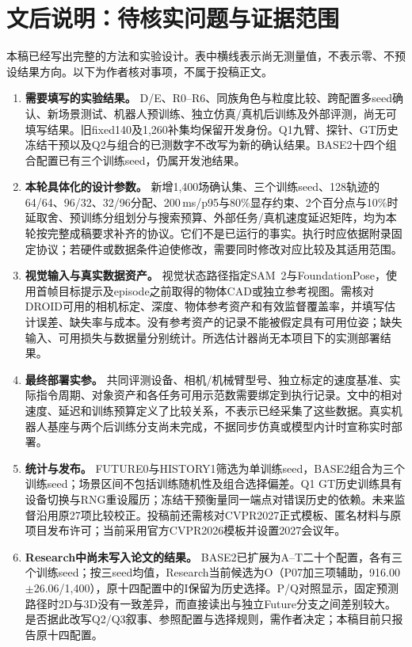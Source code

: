\section*{文后说明：待核实问题与证据范围}

本稿已经写出完整的方法和实验设计。表中横线表示尚无测量值，不表示零、不预设结果方向。以下为作者核对事项，不属于投稿正文。

\begin{enumerate}
\item \textbf{需要填写的实验结果。}
D/E、R0--R6、同族角色与粒度比较、跨配置多seed确认、新场景测试、机器人预训练、独立仿真/真机后训练及外部评测，尚无可填写结果。旧fixed140及1,260补集均保留开发身份。Q1九臂、探针、GT历史冻结干预以及Q2与组合的已测数字不改写为新的确认结果。BASE2十四个组合配置已有三个训练seed，仍属开发池结果。

\item \textbf{本轮具体化的设计参数。}
新增1,400场确认集、三个训练seed、128轨迹的64/64、96/32、32/96分配、200\,ms/p95与80\%显存约束、2个百分点与10\%时延取舍、预训练分组划分与搜索预算、外部任务/真机速度延迟矩阵，均为本轮按完整成稿要求补齐的协议。它们不是已运行的事实。执行时应依据附录固定协议；若硬件或数据条件迫使修改，需要同时修改对应比较及其适用范围。

\item \textbf{视觉输入与真实数据资产。}
视觉状态路径指定SAM~2与FoundationPose，使用首帧目标提示及episode之前取得的物体CAD或独立参考视图。需核对DROID可用的相机标定、深度、物体参考资产和有效监督覆盖率，并填写估计误差、缺失率与成本。没有参考资产的记录不能被假定具有可用位姿；缺失输入、可用损失与数据量分别统计。所选估计器尚无本项目下的实测部署结果。

\item \textbf{最终部署实参。}
共同评测设备、相机/机械臂型号、独立标定的速度基准、实际指令周期、对象资产和各任务可用示范数需要绑定到执行记录。文中的相对速度、延迟和训练预算定义了比较关系，不表示已经采集了这些数据。真实机器人基座与两个后训练分支尚未完成，不据同步仿真或模型内计时宣称实时部署。

\item \textbf{统计与发布。}
FUTURE0与HISTORY1筛选为单训练seed，BASE2组合为三个训练seed；场景区间不包括训练随机性及组合选择偏差。Q1 GT历史训练具有设备切换与RNG重设履历；冻结干预衡量同一端点对错误历史的依赖。未来监督沿用原27项比较校正。投稿前还需核对CVPR2027正式模板、匿名材料与原项目发布许可；当前采用官方CVPR2026模板并设置2027会议年。

\item \textbf{Research中尚未写入论文的结果。}
BASE2已扩展为A--T二十个配置，各有三个训练seed；按三seed均值，Research当前候选为O（P07加三项辅助，916.00$\pm$26.06/1,400），原十四配置中的I保留为历史选择。P/Q对照显示，固定预测路径时2D与3D没有一致差异，而直接读出与独立Future分支之间差别较大。是否据此改写Q2/Q3叙事、参照配置与选择规则，需作者决定；本稿目前只报告原十四配置。
\end{enumerate}

